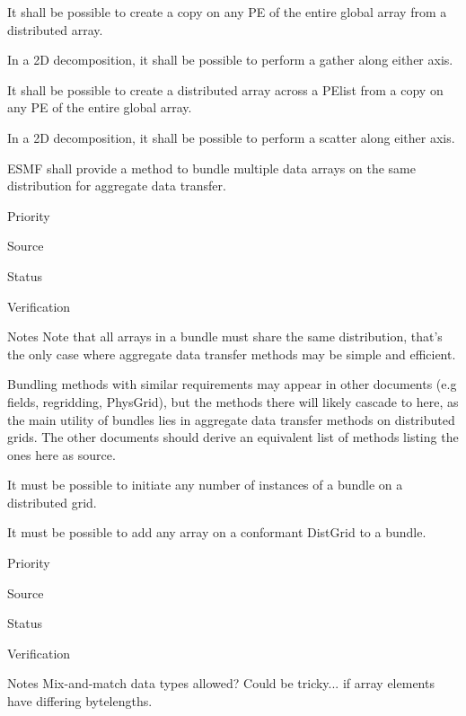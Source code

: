 
It shall be possible to create a copy on any PE of the entire global
array from a distributed array.


In a 2D decomposition, it shall be possible to perform a gather along
either axis.


It shall be possible to create a distributed array across a PElist
from a copy on any PE of the entire global array.


In a 2D decomposition, it shall be possible to perform a scatter along
either axis.


ESMF shall provide a method to bundle multiple data arrays on the same
distribution for aggregate data transfer.

\begin{reqlist}
\item[Priority]
\item[Source]
\item[Status]
\item[Verification]
\item[Notes] Note that all arrays in a bundle must share the same
  distribution, that's the only case where aggregate data transfer
  methods may be simple and efficient.
  
  Bundling methods with similar requirements may appear in other
  documents (e.g fields, regridding, PhysGrid), but the methods there
  will likely cascade to here, as the main utility of bundles lies in
  aggregate data transfer methods on distributed grids. The other
  documents should derive an equivalent list of methods listing the
  ones here as source.
\end{reqlist}


It must be possible to initiate any number of instances of a bundle on
a distributed grid.


It must be possible to add any array on a conformant DistGrid to a bundle.

\begin{reqlist}
\item[Priority]
\item[Source]
\item[Status]
\item[Verification]
\item[Notes] Mix-and-match data types allowed? Could be tricky... if
  array elements have differing bytelengths.
\end{reqlist}

